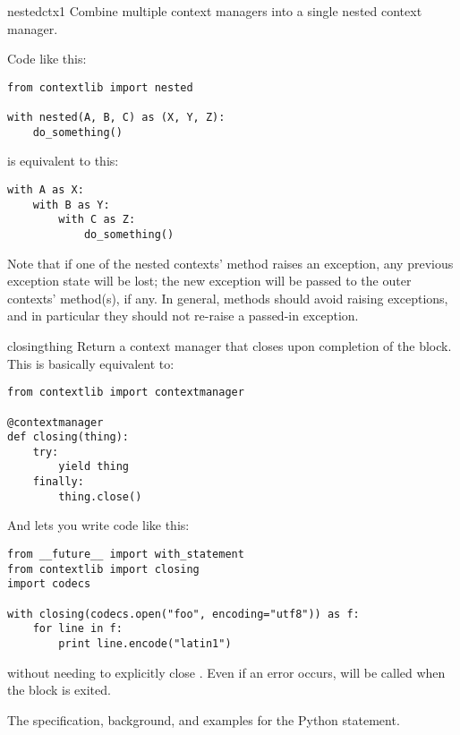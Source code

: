 \begin{funcdesc}{nested}{ctx1}
Combine multiple context managers into a single nested context manager.

Code like this:

\begin{verbatim}
from contextlib import nested

with nested(A, B, C) as (X, Y, Z):
    do_something()
\end{verbatim}

is equivalent to this:

\begin{verbatim}
with A as X:
    with B as Y:
        with C as Z:
            do_something()
\end{verbatim}

Note that if one of the nested contexts'  method
raises an exception, any previous exception state will be lost; the new
exception will be passed to the outer contexts' 
method(s), if any.  In general,  methods should avoid
raising exceptions, and in particular they should not re-raise a
passed-in exception.
\end{funcdesc}

\label{context-closing}
\begin{funcdesc}{closing}{thing}
Return a context manager that closes  upon completion of the
block.  This is basically equivalent to:

\begin{verbatim}
from contextlib import contextmanager

@contextmanager
def closing(thing):
    try:
        yield thing
    finally:
        thing.close()
\end{verbatim}

And lets you write code like this:
\begin{verbatim}
from __future__ import with_statement
from contextlib import closing
import codecs

with closing(codecs.open("foo", encoding="utf8")) as f:
    for line in f:
        print line.encode("latin1")
\end{verbatim}

without needing to explicitly close .  Even if an error occurs,
 will be called when the  block is exited.

\end{funcdesc}

\begin{seealso}
         {The specification, background, and examples for the
          Python  statement.}
\end{seealso}
